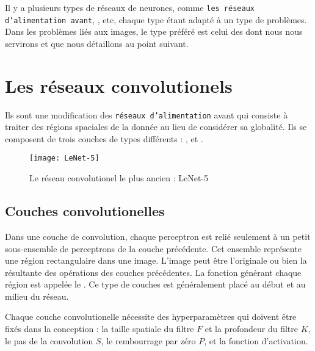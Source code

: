 Il y a plusieurs types de réseaux de neurones, comme
\texttt{les réseaux d'alimentation avant}, , etc,
chaque type étant adapté à un type de problèmes.
Dans les problèmes liés aux images, le type préféré est celui des
 dont nous nous servirons et que nous détaillons
au point suivant.

\section{Les réseaux convolutionels}

Ils sont une modification des \texttt{réseaux d'alimentation} avant qui consiste à
traiter des régions spaciales de la donnée au lieu de considérer sa globalité.
Ils se composent de trois couches de types différents :
,
 et
.

\begin{figure}[h]
\begin{center}
\texttt{[image: LeNet-5]}
\caption{Le réseau convolutionel le plus ancien : LeNet-5}{\cite{lecun1998gradient}}
\end{center}
\end{figure}

\subsection{Couches convolutionelles}

Dans une couche de convolution, chaque perceptron est relié seulement à un petit
sous-ensemble de perceptrons de la couche précédente. Cet ensemble représente
une région rectangulaire dans une image. L'image peut être l'originale ou
bien la résultante des opérations des couches précédentes. La fonction générant
chaque région est appelée le . Ce type de couches est généralement
placé au début et au milieu du réseau.

Chaque couche convolutionelle nécessite des hyperparamètres qui doivent
être fixés dans la conception : la taille spatiale du filtre $F$ et la
profondeur du filtre $K$, le pas de la convolution $S$, le rembourrage par zéro
$P$, et la fonction d'activation.

